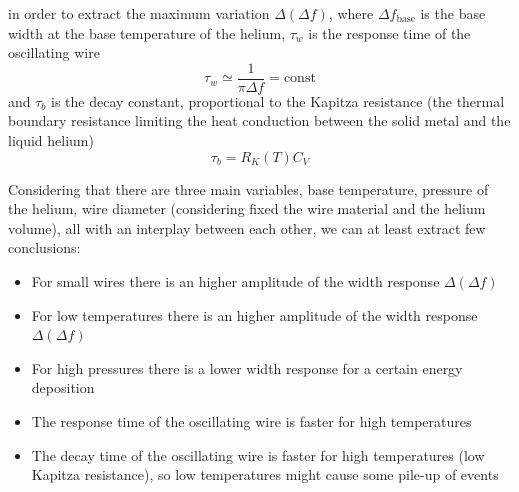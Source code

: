\documentclass[a4paper,10pt]{article}
\begin{document}
in order to extract the maximum variation $\Delta (\Delta f)$, where $\Delta f_\mathrm{base}$ is the base width at the base temperature of the helium, $\tau_w$ is the response time of the oscillating wire
\begin{equation}
  \tau_w \simeq \frac{1}{\pi \Delta f} = \mathrm{const}
\end{equation}
and $\tau_b$ is the decay constant, proportional to the Kapitza resistance (the thermal boundary resistance limiting the heat conduction between the solid metal and the liquid helium)
\begin{equation}
  \tau_b = R_K(T) C_V
\end{equation}

Considering that there are three main variables, base temperature, pressure of the helium, wire diameter (considering fixed the wire material and the helium volume), all with an interplay between each other, we can at least extract few conclusions:
\begin{itemize}
  \item For small wires there is an higher amplitude of the width response $\Delta (\Delta f)$
  \item For low temperatures there is an higher amplitude of the width response $\Delta (\Delta f)$
  \item For high pressures there is a lower width response for a certain energy deposition
  \item The response time of the oscillating wire is faster for high temperatures 
  \item The decay time of the oscillating wire is faster for high temperatures (low Kapitza resistance), so low temperatures might cause some pile-up of events

\end{itemize}
\end{document}
